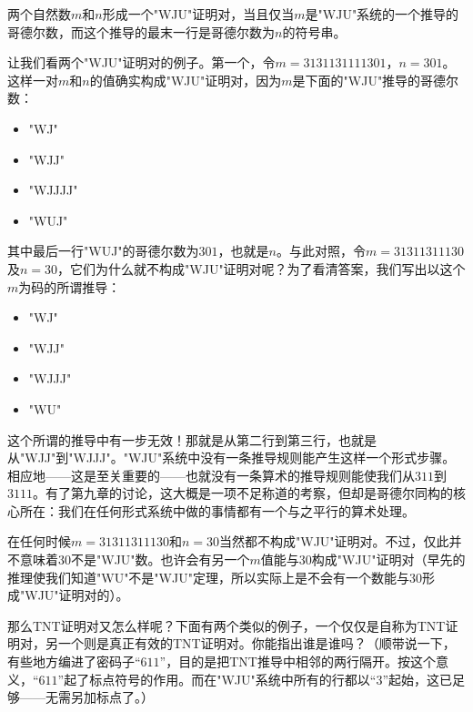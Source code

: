 \begin{block}
两个自然数$m$和$n$形成一个"WJU"证明对，当且仅当$m$是"WJU"系统的一个推导的哥德尔数，而这个推导的最末一行是哥德尔数为$n$的符号串。
\end{block}

让我们看两个"WJU"证明对的例子。第一个，令$m=3131131111301$，$n=301$。这样一对$m$和$n$的值确实构成"WJU"证明对，因为$m$是下面的"WJU"推导的哥德尔数：
\begin{itemize}
\item "WJ"
\item "WJJ"
\item "WJJJJ"
\item "WUJ"
\end{itemize}
其中最后一行"WUJ"的哥德尔数为$301$，也就是$n$。与此对照，令$m=31311311130$及$n=30$，它们为什么就不构成"WJU"证明对呢？为了看清答案，我们写出以这个$m$为码的所谓推导：
\begin{itemize}
\item "WJ"
\item "WJJ"
\item "WJJJ"
\item "WU"
\end{itemize}

这个所谓的推导中有一步无效！那就是从第二行到第三行，也就是从"WJJ"到"WJJJ"。"WJU"系统中没有一条推导规则能产生这样一个形式步骤。相应地——这是至关重要的——也就没有一条算术的推导规则能使我们从$311$到$3111$。有了第九章的讨论，这大概是一项不足称道的考察，但却是哥德尔同构的核心所在：我们在任何形式系统中做的事情都有一个与之平行的算术处理。

在任何时候$m=31311311130$和$n=30$当然都不构成"WJU"证明对。不过，仅此并不意味着$30$不是"WJU"数。也许会有另一个$m$值能与$30$构成"WJU"证明对（早先的推理使我们知道"WU"不是"WJU"定理，所以实际上是不会有一个数能与$30$形成"WJU"证明对的）。

那么TNT证明对又怎么样呢？下面有两个类似的例子，一个仅仅是自称为TNT证明对，另一个则是真正有效的TNT证明对。你能指出谁是谁吗？（顺带说一下，有些地方编进了密码子“$611$”，目的是把TNT推导中相邻的两行隔开。按这个意义，“$611$”起了标点符号的作用。而在"WJU"系统中所有的行都以“$3$”起始，这已足够——无需另加标点了。）

